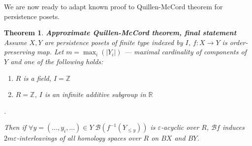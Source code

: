 \documentclass[a4paper, 12pt]{article}
\newtheorem{theorem}{Theorem}
\theoremstyle{definition}
\theoremstyle{remark}
\begin{document}
We are now ready to adapt known proof to Quillen-McCord theorem for persistence posets.

\begin{theorem} \textbf{Approximate Quillen-McCord theorem, final statement}\\
  Assume $X, Y$ are persistence posets of finite type indexed by $I$, $f : X \to Y$ is order-preserving map. Let $m = \max_{i}(|Y_i|)$ --- maximal cardinality of components of $Y$ and one of the following holds:\\
  \begin{enumerate}
    \item $R$ is a field, $I = \mathbb{Z}$
    \item $R = \mathbb{Z}$, $I$ is an infinite additive subgroup in $\mathbb{R}$
  \end{enumerate}.

  Then if $\forall y=(\ldots,y_i,\ldots) \in Y\;\mathcal{B}(f^{-1}(Y_{\leqslant y}))$ is $\varepsilon$-acyclic over $R$, $\mathcal{B}f$ induces $2m\varepsilon$-interleavings of all homology spaces over $R$ on $BX$ and $BY$.\\
\end{theorem}
\end{document}
